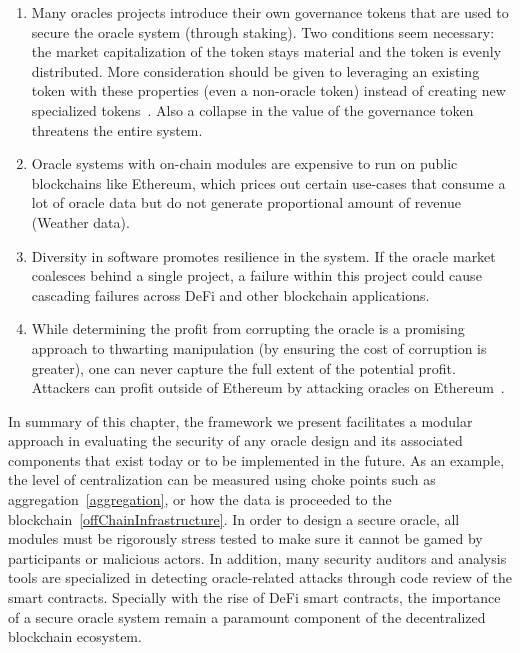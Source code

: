 \begin{enumerate}
    \item Many oracles projects introduce their own governance tokens that are used to secure the oracle system (\eg through staking). Two conditions seem necessary: the market capitalization of the token stays material and the token is evenly distributed. More consideration should be given to leveraging an existing token with these properties (even a non-oracle token) instead of creating new specialized tokens~\cite{vitalikuni}. Also a collapse in the value of the governance token threatens the entire system.

    \item Oracle systems with on-chain modules are expensive to run on public blockchains like Ethereum, which prices out certain use-cases that consume a lot of oracle data but do not generate proportional amount of revenue (\eg Weather data). 


    \item Diversity in software promotes resilience in the system. If the oracle market coalesces  behind a single project, a failure within this project could cause cascading failures across DeFi and other blockchain applications.  

    \item While determining the profit from corrupting the oracle is a promising approach to thwarting manipulation (by ensuring the cost of corruption is greater), one can never capture the full extent of the potential profit. Attackers can profit outside of Ethereum by attacking oracles on Ethereum~\cite{FoBo19}.

\end{enumerate}

In summary of this chapter, the framework we present facilitates a modular approach in evaluating the security of any oracle design and its associated components that exist today or to be implemented in the future. As an example, the level of centralization can be measured using choke points such as aggregation~\ref{aggregation}, or how the data is proceeded to the blockchain~\ref{offChainInfrastructure}. In order to design a secure oracle, all modules must be rigorously stress tested to make sure it cannot be gamed by participants or malicious actors. In addition, many security auditors and analysis tools are specialized in detecting oracle-related attacks through code review of the smart contracts. Specially with the rise of DeFi smart contracts, the importance of a secure oracle system remain a paramount component of the decentralized blockchain ecosystem.


